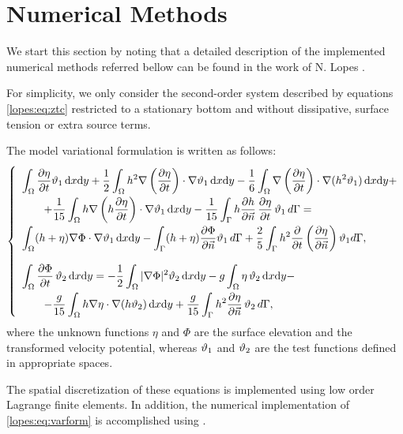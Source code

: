 
\section{Numerical Methods}
We start this section by noting that a detailed description
of  the implemented numerical methods referred bellow
can be found in the work of N. Lopes \cite{N.Lopes2007}.

For simplicity, we only consider
the second-order system described by
equations \eqref{lopes:eq:ztc}  restricted to a stationary
bottom and without
dissipative, surface tension or extra source terms.

The model variational formulation is written as follows:
\begin{equation}\label{lopes:eq:varform}
\renewcommand{\arraystretch}{2.0}
\left\{
\begin{array}{l}
\displaystyle \int_\Omega\fpar{\eta}{t}\fba\, \dx\dy
+\frac{1}{2}\int_\Omega
h^2\nabla\left(\fpar{\eta}{t}\right)\cdot\nabla\fba\, \dx\dy-
\frac{1}{6}\int_\Omega \nabla\left( \fpar{\eta}{t}\right)\cdot\nabla(h^2\fba)\, \dx\dy+\\
\quad \quad\displaystyle +
\frac{1}{15}\int_\Omega h\nabla\left(h\fpar{\eta}{t}\right)\cdot \nabla\fba\, \dx\dy-
\frac{1}{15}\int_\Gamma
h\fpar{h}{\vec{n}}\,\fpar{\eta}{t}\,\fba\, d\Gamma=
\quad\\\displaystyle
\int_\Omega(h+\eta)\nabla\Phi\cdot\nabla\fba\, \dx\dy
-\int_\Gamma(h+\eta)\fpar{\Phi}{\vec{n}}\fba\, d\Gamma
+\frac{2}{5}\int_\Gamma
h^2\fpar{}{t}\left(\fpar{\eta}{\vec{n}}\right)\fba d\Gamma,
\vspace{0.3cm} \\
\displaystyle \int_\Omega \fpar{\Phi}{t}\,\fbb\, \dx\dy=
-\frac{1}{2}\int_\Omega|\nabla\Phi|^2\fbb\, \dx\dy
-g\int_\Omega \eta\,\fbb\, \dx\dy-
\\
\quad\quad\displaystyle-\frac{g}{15}\int_\Omega h\nabla\eta\cdot\nabla(h\fbb)\, \dx\dy +\frac{g}{15}\int_\Gamma h^2\fpar{\eta}{\vec{n}}\,\fbb\, d\Gamma,
\end{array}
\right .
\end{equation}
where  the unknown functions
\(\eta\) and \(\Phi\) are the surface elevation and the
transformed velocity potential, whereas  \(\vartheta_1\) and \(\vartheta_2\)
are the test functions defined in  appropriate spaces.

The spatial  discretization of these equations
is implemented  using low order  Lagrange finite elements.
In addition, the numerical implementation
of \eqref{lopes:eq:varform} is accomplished using  \ffc.

